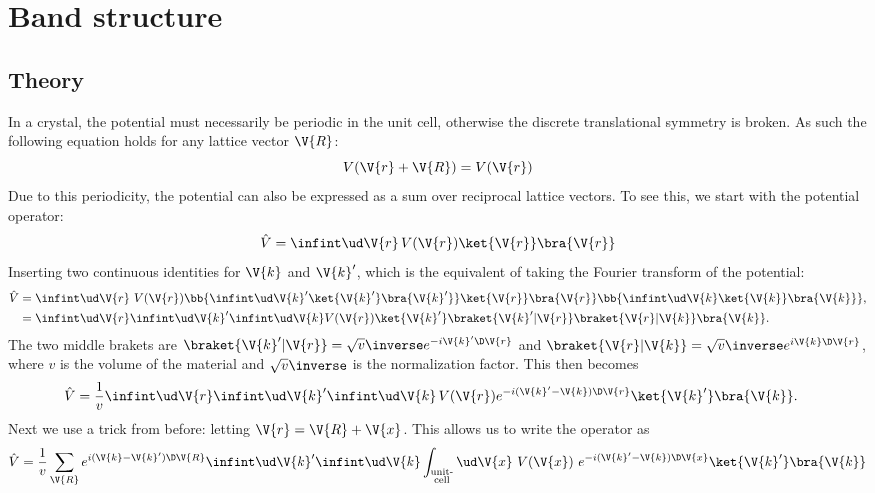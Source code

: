 \documentclass[main.tex]{subfiles}
\begin{document}
	
	\section{Band structure}\label{seq:band_structure}
	\subsection{Theory}
	In a crystal, the potential must necessarily be periodic in the unit cell, otherwise the discrete translational symmetry is broken. As such the following equation holds for any lattice vector $ \V{R} $:
	\begin{equation}\label{eq:band_period_V}
		V(\V{r}+\V{R}) = V(\V{r})
	\end{equation}
	Due to this periodicity, the potential can also be expressed as a sum over reciprocal lattice vectors. To see this, we start with the potential operator:
	\begin{equation}
		\hat{V} = \infint \ud \V{r} \, V(\V{r}) \ket{\V{r}}\bra{\V{r}}
	\end{equation}
	Inserting two continuous identities for $ \V{k} $ and $ \V{k}' $, which is the equivalent of taking the Fourier transform of the potential: 
	\begin{align}
		\hat{V} &= \infint \ud \V{r}\ V(\V{r}) \bb{\infint \ud \V{k}' \ket{\V{k}'} \bra{\V{k}'}} \ket{\V{r}}\bra{\V{r}} \bb{\infint \ud \V{k} \ket{\V{k}} \bra{\V{k}}}, \\
		&= \infint \ud\V{r} \infint \ud \V{k}' \infint \ud \V{k} V(\V{r}) \ket{\V{k}'} \braket{\V{k}' | \V{r}} \braket{\V{r} | \V{k}} \bra{\V{k}}.
	\end{align}
	The two middle brakets are $ \braket{\V{k}'| \V{r}}= \sqrt{v}\inverse e^{-i \V{k}' \D \V{r}} $ and $ \braket{\V{r} | \V{k}} = \sqrt{v}\inverse e^{i \V{k} \D \V{r}} $,  where $ v $ is the volume of the material and $ \sqrt{v}\inverse $ is the normalization factor. This then becomes
	\begin{align}
		\hat{V} &= \frac{1}{v} \infint \ud\V{r} \infint \ud \V{k}' \infint \ud \V{k}\, V(\V{r}) e^{-i(\V{k}'-\V{k}) \D \V{r}} \ket{\V{k}'} \bra{\V{k}}.
	\end{align}
	Next we use a trick from before: letting $ \V{r} = \V{R} + \V{x} $. This allows us to write the operator as
	\begin{equation}
		\hat{V} = \frac{1}{v} \sum_{\V{R}} e^{i(\V{k}-\V{k}') \D \V{R}} \infint \ud \V{k}' \infint \ud \V{k} \int_{\substack{\text{unit-} \\\text{cell}}} \ud \V{x}\ V(\V{x})\  e^{-i (\V{k}'-\V{k}) \D \V{x}} \ket{\V{k}'} \bra{\V{k}}
	\end{equation}
\end{document}

